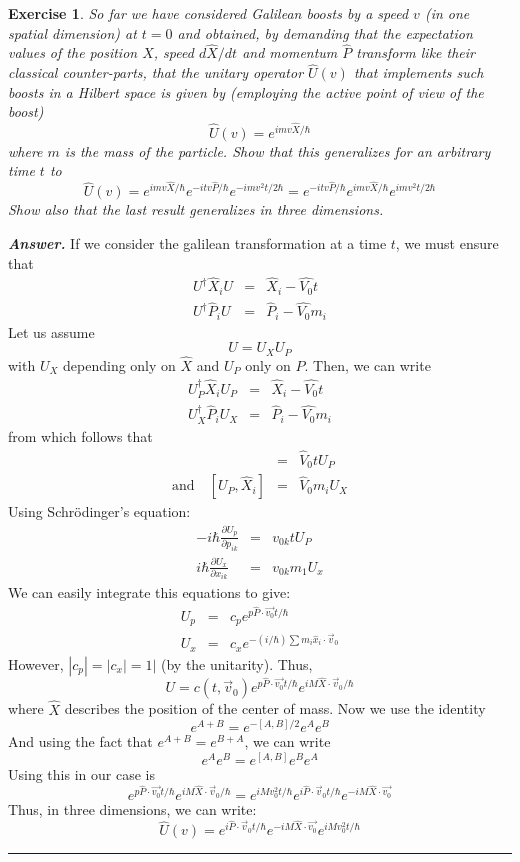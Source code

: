 \documentclass[12pt]{article}
\def\be{\begin{equation}}
\def\ee{\end{equation}}
\def\bea{\begin{eqnarray*}}
\def\eea{\end{eqnarray*}}
\def\f{\frac}
\newtheorem{exercise}{Exercise}
\newenvironment{answer}{\noindent\textbf{\textit{Answer.}} \normalfont }{\par\noindent\rule{\textwidth}{0.4pt}}
\begin{document}
	\begin{exercise}
		So far we have considered Galilean boosts by a speed $v$ (in one spatial dimension) at $t = 0$ and obtained, by demanding that the expectation values of the
		position $\hat{X}$, speed $d\hat{X}/dt$ and momentum $\hat{P}$ transform like their classical counter-parts, that the unitary operator $\hat{U}(v)$ that implements such boosts in a Hilbert space is given by (employing the active point of view of the boost)
		\be
			\hat{U}(v) = e^{imv\hat{X}/\hbar}
		\ee
		where $m$ is the mass of the particle. Show that this generalizes for an arbitrary time $t$ to
		\be
			\hat{U}(v) = e^{imv\hat{X}/\hbar}e^{-itv\hat{P}/\hbar}e^{-imv^2t/2\hbar} =  e^{-itv\hat{P}/\hbar}e^{imv\hat{X}/\hbar}e^{imv^2t/2\hbar}
		\ee
		Show also that the last result generalizes in three dimensions.	
	\end{exercise}
	\begin{answer}
		If we consider the galilean transformation at a time $t$, we must ensure that
		\bea
			U^\dagger \hat{X}_i U &=& \hat{X}_i - \hat{V_0}t \\
			U^\dagger \hat{P}_i U &=& \hat{P}_i - \hat{V_0}m_i
		\eea
		Let us assume
		\be
			U = U_XU_P
		\ee
		with $U_X$ depending only on $\hat{X}$ and $U_P$ only on $\hat{P}$. Then, we can write
		\bea
			U_P^\dagger \hat{X}_i U_P &=& \hat{X}_i - \hat{V_0}t \\
			U_X^\dagger \hat{P}_i U_X &=& \hat{P}_i - \hat{V_0}m_i
		\eea
		from which follows that
		\bea
			[U_P, \hat{X}_i] &=& \hat{V}_0tU_P \\   
			\text{and}\quad [U_P, \hat{X}_i] &=& \hat{V}_0 m_i U_X
		\eea
		Using Schrödinger's equation:
		\bea
			-i\hbar\f{\partial U_p}{\partial p_{ik}} &=& v_{0k} tU_P \\
			i\hbar\f{\partial U_x}{\partial x_{ik}} &=& v_{0k} m_1U_x
		\eea
		We can easily integrate this equations to give:
		\bea
			U_p &=& c_p e^{p\hat{P}\cdot\vec{v_0}t/\hbar} \\
			U_x &=& c_x e^{-(i/\hbar)\sum m_i\hat{x}_i\cdot\vec{v}_0}
		\eea
		However, $|c_p|=|c_x|=1|$ (by the unitarity). Thus,
		\be
			U = c(t, \vec{v}_0) e^{p\hat{P}\cdot\vec{v_0}t/\hbar} e^{iM\hat{X}\cdot\vec{v}_0/\hbar}
		\ee
		where $\hat{X}$ describes the position of the center of mass. Now we use the identity
		\be
			e^{A+B} = e^{-[A, B]/2}e^Ae^B
		\ee
		And using the fact that $e^{A+B}=e^{B+A}$, we can write
		\be
			e^Ae^B = e^{[A, B]}e^Be^A
		\ee
		Using this in our case is
		\be
			e^{p\hat{P}\cdot\vec{v_0}t/\hbar} e^{iM\hat{X}\cdot\vec{v}_0/\hbar} = e^{iMv_0^2t/\hbar} e^{i\hat{P}\cdot\vec{v}_0t/\hbar} e^{-iM\hat{X}\cdot\vec{v_0}}
		\ee
		Thus, in three dimensions, we can write:
		\be
			\hat{U}(v) = e^{i\hat{P}\cdot\vec{v}_0t/\hbar} e^{-iM\hat{X}\cdot\vec{v_0}}e^{iMv_0^2t/\hbar}
		\ee
	\end{answer}
	
\end{document}
